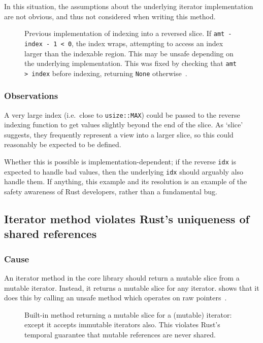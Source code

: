 \documentclass[dissertation.tex]{subfiles}
\begin{document}
In this situation, the assumptions about the underlying iterator
implementation are not obvious, and thus not considered when writing
this method.

\begin{figure}[ht]
    
    \caption{
        Previous implementation of indexing into a reversed slice.
        If \texttt{amt - index - 1 < 0}, the index wraps, attempting to
        access an index larger than the indexable region.
        This may be unsafe depending on the underlying implementation.
        This was fixed by checking that \texttt{amt > index} before
        indexing, returning \texttt{None}
        otherwise~\cite{rust-commit-reverse}.
    }
    \label{lst:bug-reverse}
\end{figure}

\subsubsection{Observations}
A very large index (i.e.\ close to \texttt{usize::MAX}) could be passed
to the reverse indexing function to get values slightly beyond the end
of the slice.
As `slice' suggests, they frequently represent a view into a larger
slice, so this could reasonably be expected to be defined.

Whether this is possible is implementation-dependent; if the
reverse \texttt{idx} is expected to handle bad values, then the
underlying \texttt{idx} should arguably also handle them.
If anything, this example  and its resolution is an example of the
safety awareness of Rust developers, rather than a fundamental bug.


\subsection{Iterator method violates Rust's uniqueness of shared references}
\label{sec:eval-bug-vec-mut}

\subsubsection{Cause}
An iterator method in the core library should return a mutable slice
from a mutable iterator.
Instead, it returns a mutable slice for any iterator.
 shows that it does this by calling an unsafe
method which operates on raw pointers~\cite{rust-issue-vec-mut}.

\begin{figure}[ht]
    
    \caption{
        Built-in method returning a mutable slice for a (mutable)
        iterator: except it accepts immutable iterators also.
        This violates Rust's temporal guarantee that mutable references
        are never shared.
    }
    \label{lst:bug-mutslice}
\end{figure}
\end{document}
